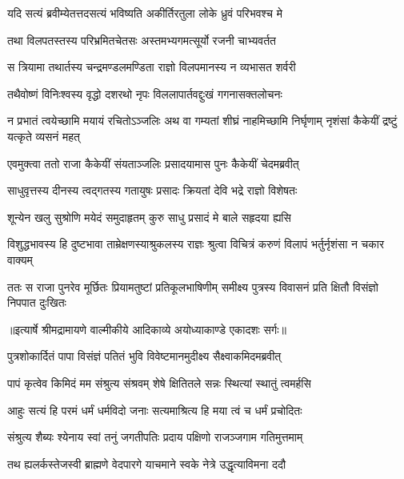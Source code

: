 \twolineshloka
{यदि सत्यं ब्रवीम्येतत्तदसत्यं भविष्यति}
{अकीर्तिरतुला लोके ध्रुवं परिभवश्च मे} %

\twolineshloka
{तथा विलपतस्तस्य परिभ्रमितचेतसः}
{अस्तमभ्यगमत्सूर्यो रजनी चाभ्यवर्तत} %

\twolineshloka
{स त्रियामा तथार्तस्य चन्द्रमण्डलमण्डिता}
{राज्ञो विलपमानस्य न व्यभासत शर्वरी} %

\twolineshloka
{तथैवोष्णं विनिःश्वस्य वृद्धो दशरथो नृपः}
{विललापार्तवद्दुःखं गगनासक्तलोचनः} %

\threelineshloka
{न प्रभातं त्वयेच्छामि मयायं रचितोऽञ्जलिः}
{अथ वा गम्यतां शीघ्रं नाहमिच्छामि निर्घृणाम्}
{नृशंसां कैकेयीं द्रष्टुं यत्कृते व्यसनं महत्} %

\twolineshloka
{एवमुक्त्वा ततो राजा कैकेयीं संयताञ्जलिः}
{प्रसादयामास पुनः कैकेयीं चेदमब्रवीत्} %

\twolineshloka
{साधुवृत्तस्य दीनस्य त्वद्गतस्य गतायुषः}
{प्रसादः क्रियतां देवि भद्रे राज्ञो विशेषतः} %

\twolineshloka
{शून्येन खलु सुश्रोणि मयेदं समुदाहृतम्}
{कुरु साधु प्रसादं मे बाले सहृदया ह्यसि} %

\fourlineindentedshloka
{विशुद्धभावस्य हि दुष्टभावा}
{ ताम्रेक्षणस्याश्रुकलस्य राज्ञः}
{श्रुत्वा विचित्रं करुणं विलापं}
{ भर्तुर्नृशंसा न चकार वाक्यम्} %

\fourlineindentedshloka
{ततः स राजा पुनरेव मूर्छितः}
{ प्रियामतुष्टां प्रतिकूलभाषिणीम्}
{समीक्ष्य पुत्रस्य विवासनं प्रति}
{ क्षितौ विसंज्ञो निपपात दुःखितः} %


{॥इत्यार्षे श्रीमद्रामायणे वाल्मीकीये आदिकाव्ये अयोध्याकाण्डे एकादशः सर्गः॥}


\twolineshloka
{पुत्रशोकार्दितं पापा विसंज्ञं पतितं भुवि}
{विवेष्टमानमुदीक्ष्य सैक्ष्वाकमिदमब्रवीत्} %

\twolineshloka
{पापं कृत्वेव किमिदं मम संश्रुत्य संश्रवम्}
{शेषे क्षितितले सन्नः स्थित्यां स्थातुं त्वमर्हसि} %

\twolineshloka
{आहुः सत्यं हि परमं धर्मं धर्मविदो जनाः}
{सत्यमाश्रित्य हि मया त्वं च धर्मं प्रचोदितः} %

\twolineshloka
{संश्रुत्य शैब्यः श्येनाय स्वां तनुं जगतीपतिः}
{प्रदाय पक्षिणो राजञ्जगाम गतिमुत्तमाम्} %

\twolineshloka
{तथ ह्यलर्कस्तेजस्वी ब्राह्मणे वेदपारगे}
{याचमाने स्वके नेत्रे उद्धृत्याविमना ददौ} %


